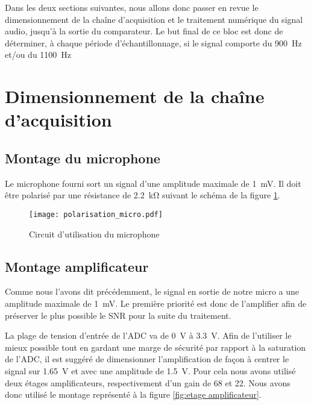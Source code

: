 Dans les deux sections suivantes, nous allons donc passer en revue le dimensionnement de la chaîne d'acquisition et le traitement numérique du signal audio, jusqu'à la sortie du comparateur. Le but final de ce bloc est donc de déterminer, à chaque période d'échantillonnage, si le signal comporte du \SI{900}{\hertz} et/ou du \SI{1100}{\hertz}

\section{Dimensionnement de la chaîne d'acquisition}

\subsection{Montage du microphone}
Le microphone fourni sort un signal d'une amplitude maximale de \SI{1}{\milli\volt}. Il doit être polarisé par une résistance de \SI{2.2}{\kilo\ohm} suivant le schéma de la figure \ref{fig:polarisation du micro}.
\begin{figure}[htbp]
\centering
\texttt{[image: polarisation\_micro.pdf]}
\caption{Circuit d'utilisation du microphone}
\label{fig:polarisation du micro}
\end{figure}

\subsection{Montage amplificateur}
Comme nous l'avons dit précédemment, le signal en sortie de notre micro a une amplitude maximale de \SI{1}{\milli\volt}. Le première priorité est donc de l'amplifier afin de préserver le plus possible le SNR pour la suite du traitement.

La plage de tension d'entrée de l'ADC va de \SI{0}{\volt} à \SI{3.3}{\volt}. Afin de l'utiliser le mieux possible tout en gardant une marge de sécurité par rapport à la saturation de l'ADC, il est suggéré de dimensionner l'amplification  de façon à centrer le signal sur \SI{1.65}{\volt} et avec une amplitude de \SI{1.5}{\volt}. Pour cela nous avons utilisé deux étages amplificateurs, respectivement d'un gain de 68 et 22. Nous avons donc utilisé le montage représenté à la figure \ref{fig:etage amplificateur}.

